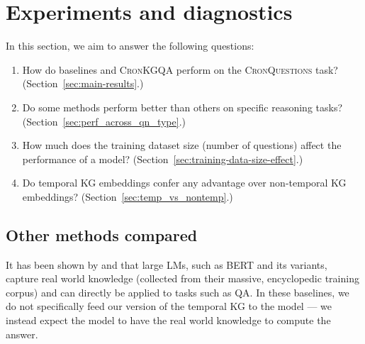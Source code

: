 \documentclass[11pt,a4paper]{article}
\newcommand{\method}{\textsc{CronKGQA}}
\newcommand{\dataset}{\textsc{CronQuestions}}
\begin{document}
\begin{table*}[ht!]
{\begin{tabular}{l|r|rr|rr|rrrrr}
\end{tabular}}
\caption{Performance of baselines and our methods on the \dataset{} dataset. Methods above the midrule do not use any KG embeddings, while the ones below use either temporal or non-temporal KG embeddings. Hits@10 are not available for T5-3B since it is a text-to-text model and makes a single prediction. Please refer to Section \ref{sec:main-results} for details.}
\label{tab:main-results}
\end{table*}


 










\section{Experiments and diagnostics}
\label{sec:Expt}
In this section, we aim to answer the following questions:
\begin{enumerate}
    \item How do baselines and \method{} perform on the \dataset{} task? (Section~\ref{sec:main-results}.)
    \item Do some methods perform better than others on specific reasoning tasks? (Section~\ref{sec:perf_across_qn_type}.)
    \item How much does the training dataset size (number of questions) affect the performance of a model? (Section~\ref{sec:training-data-size-effect}.)
    \item Do temporal KG embeddings confer any advantage over non-temporal KG embeddings? (Section~\ref{sec:temp_vs_nontemp}.)
\end{enumerate}


\subsection{Other methods compared}

It has been shown by \citet{petroni2019language} and \citet{raffel2020exploring} that large LMs, such as BERT and its variants, capture real world knowledge (collected from their massive, encyclopedic training corpus) and can directly be applied to tasks such as QA. In these baselines, we do not specifically feed our version of the temporal KG to the model --- we instead expect the model to have the real world knowledge to compute the answer. 
\end{document}
